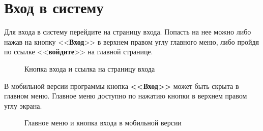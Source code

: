 \documentclass[a4paper]{article}
\begin{document}
\section{Вход в систему}

Для входа в систему перейдите на страницу входа. Попасть на нее можно либо нажав на кнопку <<\textbf{Вход}>> в верхнем правом углу главного меню, либо пройдя по ссылке <<\textbf{войдите}>> на главной странице.

\begin{figure}[h]
\caption{Кнопка входа и ссылка на страницу входа}
\label{fig:image3}
\end{figure}

В мобильной версии программы кнопка \textbf{<<Вход>>} может быть скрыта в главном меню. Главное меню доступно по нажатию кнопки в верхнем правом углу экрана.

\begin{figure}[h]
\caption{Главное меню и кнопка входа в мобильной версии}
\label{fig:image4}
\end{figure}
\end{document}
